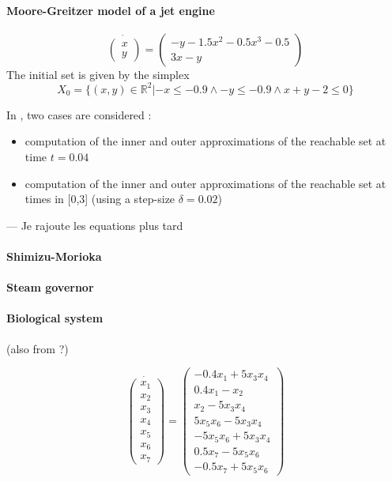 \documentclass{sig-alternate-05-2015} %
\newcommand\ForAuthors[1]%
 {\par\smallskip                     %
  \begin{center}%
   \fbox%
   {\parbox{0.9\linewidth}%
    {\raggedright\sc--- #1}%
   }%
  \end{center}%
  \par\smallskip                     %
 }
\def\R{{\mathbb R}}
\begin{document}
\paragraph{Moore-Greitzer model of a jet engine}
\begin{equation}
\dot{\left(\begin{array}{c}
x \\
y
\end{array}\right)} = \left(\begin{array}{c}
-y-1.5x^2-0.5x^3-0.5 \\
3x-y
\end{array}\right)
\end{equation}
The initial set is given by the simplex 
$$X_0=\{(x,y) \in \R^2 | -x \leq -0.9 \wedge -y \leq -0.9\wedge x+y-2 \leq 0\}$$

In \cite{Underapproxflowpipes}, two cases are considered : 
\begin{itemize}
\item computation of the inner and outer approximations of the reachable set at time
$t=0.04$
\item computation of the inner and outer approximations of the reachable set at times
in [0,3] (using a step-size $\delta=0.02$)
\end{itemize}

\ForAuthors{Je rajoute les equations plus tard}

\paragraph{Shimizu-Morioka}

\paragraph{Steam governor}

\paragraph{Biological system}

(also from \cite{underapprox16}?)

\begin{equation}
\dot{\left(\begin{array}{c}
x_1 \\
x_2 \\
x_3 \\
x_4 \\
x_5 \\
x_6 \\
x_7
\end{array}\right)} = \left(\begin{array}{c}
-0.4x_1+5x_3x_4 \\
0.4x_1-x_2 \\
x_2-5x_3x_4 \\
5x_5x_6-5x_3x_4 \\
-5x_5x_6+5x_3x_4 \\
0.5x_7-5x_5x_6 \\
-0.5x_7+5x_5x_6
\end{array}\right)
\end{equation}
\end{document}
